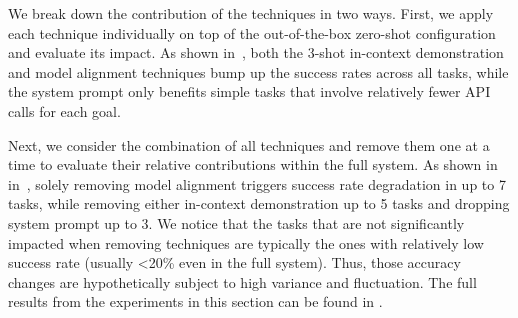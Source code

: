

We break down the contribution of the techniques in two ways.
First, we apply each technique individually on top of the out-of-the-box zero-shot configuration and evaluate its impact. 
As shown in~, both the 3-shot in-context demonstration and model alignment techniques bump up the success rates across all tasks, while the system prompt only benefits simple tasks that involve relatively fewer API calls for each goal.

Next, we consider the combination of all techniques and remove them one at a time to evaluate their relative contributions within the full system. As shown in in~, solely removing model alignment triggers success rate degradation in up to 7 tasks, while removing either in-context demonstration up to 5 tasks and dropping system prompt up to 3. We notice that the tasks that are not significantly impacted when removing techniques are typically the ones with relatively low success rate (usually <20\% even in the full system). Thus, those accuracy changes are hypothetically subject to high variance and fluctuation.
The full results from the experiments in this section can be found in .




